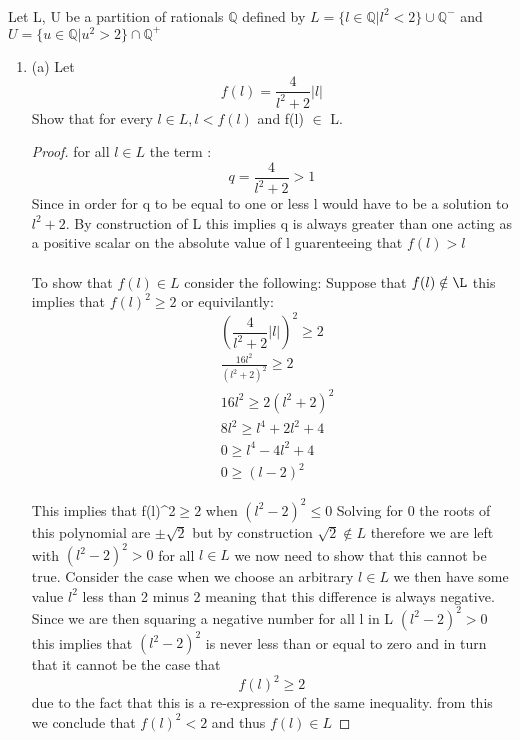 \documentclass[11pt]{article}
\theoremstyle{definition}  %
\newcommand{\Q}{\mathbb{Q}}
\begin{document}
\\
Let {L, U} be a partition of rationals $\Q$ defined by $L = \{l \in \Q|l^2 < 2\}\cup \Q^-$
and $U = \{u \in \Q|u^
2 > 2\} \cap \Q^+$
\begin{enumerate}

  \item (a) Let
  \[
    f(l)=\frac{4}{l^2+2}|l|
  \] Show that for every $l \in  L, l < f(l)$ and f(l) $\in$ L.

\begin{proof}
  for all $l \in L$ the term : \
  \[
    q=\frac{4}{l^2+2}>1
  \]
  Since in order for q to be equal to one or less l would have to be a solution to $l^2+2$. By construction of L this implies q is always greater than one acting as a positive scalar on the absolute value of l guarenteeing that $f(l)>l$\\\\
  To show that $f(l)\in L$ consider the following: Suppose that $f(l)\notin \L$ this implies that $f(l)^2 \geq 2$ or equivilantly:
  \[
    \left(\frac{4}{l^2+2}|l|\right)^2\geq 2
  \]
  \begin{align*}
    &\frac{16l^2}{(l^2+2)^2}\geq 2\\
    &16l^2\geq 2(l^2+2)^2\\
    &8l^2\geq l^4+2l^2+4\\
    &0\geq l^4-4l^2+4\\
    &0\geq (l-2)^2
  \end{align*}

  This implies that f(l)^2$\geq 2$ when $(l^2-2)^2\leq 0$ Solving for 0 the roots of this polynomial are $\pm\sqrt{2}$ but by construction $\sqrt{2} \notin L$ therefore we are left with  $(l^2-2)^2>0 $ for all $l\in L$ we now need to show that this cannot be true. Consider the case when we choose an arbitrary $l \in L$ we then have some value $l^2$ less than 2 minus 2 meaning that this difference is always negative. Since we are then squaring a negative number for all l in L $(l^2-2)^2>0$ this implies that $(l^2-2)^2$ is never less than or equal to zero and in turn that it cannot be the case that\[
    f(l)^2\geq 2
  \] due to the fact that this is a re-expression of the same inequality.  from this we conclude  that $f(l)^2<2$ and thus $f(l)\in L$



\end{proof}
\end{enumerate}
\end{document}
